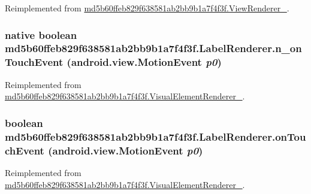 Reimplemented from \hyperlink{classmd5b60ffeb829f638581ab2bb9b1a7f4f3f_1_1_view_renderer__2_dae20979ac761a65aa60c9b427509c37}{md5b60ffeb829f638581ab2bb9b1a7f4f3f.ViewRenderer\_}.\hypertarget{classmd5b60ffeb829f638581ab2bb9b1a7f4f3f_1_1_label_renderer_5d58dc5f8f8a367964cfd8fbd30be3f0}{
\subsubsection[{n\_\-onTouchEvent}]{\setlength{\rightskip}{0pt plus 5cm}native boolean md5b60ffeb829f638581ab2bb9b1a7f4f3f.LabelRenderer.n\_\-onTouchEvent (android.view.MotionEvent {\em p0})}}
\label{classmd5b60ffeb829f638581ab2bb9b1a7f4f3f_1_1_label_renderer_5d58dc5f8f8a367964cfd8fbd30be3f0}




Reimplemented from \hyperlink{classmd5b60ffeb829f638581ab2bb9b1a7f4f3f_1_1_visual_element_renderer__1_bf46ffd446313b87383a085a60d65dd4}{md5b60ffeb829f638581ab2bb9b1a7f4f3f.VisualElementRenderer\_}.\hypertarget{classmd5b60ffeb829f638581ab2bb9b1a7f4f3f_1_1_label_renderer_364b8f793419ee7c9d991b140708c0b5}{
\subsubsection[{onTouchEvent}]{\setlength{\rightskip}{0pt plus 5cm}boolean md5b60ffeb829f638581ab2bb9b1a7f4f3f.LabelRenderer.onTouchEvent (android.view.MotionEvent {\em p0})}}
\label{classmd5b60ffeb829f638581ab2bb9b1a7f4f3f_1_1_label_renderer_364b8f793419ee7c9d991b140708c0b5}




Reimplemented from \hyperlink{classmd5b60ffeb829f638581ab2bb9b1a7f4f3f_1_1_visual_element_renderer__1_3beb6d0ebf9e1eca68fed2eac13c88ac}{md5b60ffeb829f638581ab2bb9b1a7f4f3f.VisualElementRenderer\_}.

